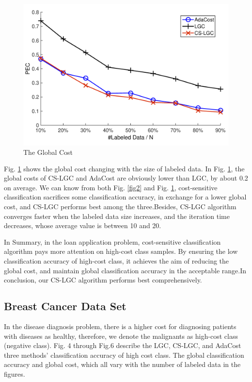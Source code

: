 \documentclass{svjour3}                     %
\begin{document}
\begin{figure}[H]
\includegraphics[width=\textwidth]{plot/fig3.pdf}
\caption{The Global Cost} \label{fig3}
\end{figure}
Fig. \ref{fig3} shows the global cost changing with the size of labeled data. In Fig. \ref{fig3}, the global costs of CS-LGC and AdaCost are obviously lower than LGC, by about 0.2 on average. We can know from both Fig. \ref{fig2} and Fig. \ref{fig3}, cost-sensitive classification sacrifices some classification accuracy, in exchange for a lower global cost, and CS-LGC performs best among the three.Besides, CS-LGC algorithm converges faster when the labeled data size increases, and the iteration time decreases, whose average value is between 10 and 20. 

In Summary, in the loan application problem, cost-sensitive classification algorithm pays more attention on high-cost class samples. By ensuring the low classification accuracy of high-cost class, it achieves the aim of reducing the global cost, and maintain global classification accuracy in the acceptable range.In conclusion, our CS-LGC algorithm performs best comprehensively.

\subsection{Breast Cancer Data Set}\label{subsec:exp2}
In the disease diagnosis problem, there is a higher cost for diagnosing patients with diseases as healthy, therefore, we denote the malignants as high-cost class (negative class). Fig. 4 through Fig.6 describe the LGC, CS-LGC, and AdaCost three methods' classification accuracy of high cost class. The global classification accuracy and global cost, which all vary with the number of labeled data in the figures.
\end{document}
